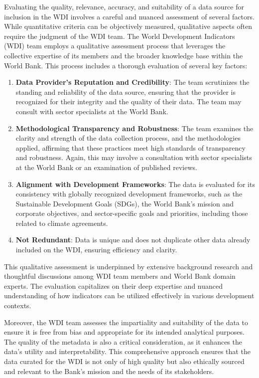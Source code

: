 \documentclass[
  11pt,
  a4paper,
  DIV=11,
  numbers=noendperiod]{scrreprt}
\begin{document}
Evaluating the quality, relevance, accuracy, and suitability of a data
source for inclusion in the WDI involves a careful and nuanced
assessment of several factors. While quantitative criteria can be
objectively measured, qualitative aspects often require the judgment of
the WDI team. The World Development Indicators (WDI) team employs a
qualitative assessment process that leverages the collective expertise
of its members and the broader knowledge base within the World Bank.
This process includes a thorough evaluation of several key factors:

\begin{enumerate}
\def\labelenumi{\arabic{enumi}.}
\item
  \textbf{Data Provider's Reputation and Credibility}: The team
  scrutinizes the standing and reliability of the data source, ensuring
  that the provider is recognized for their integrity and the quality of
  their data. The team may consult with sector specialists at the World
  Bank.
\item
  \textbf{Methodological Transparency and Robustness}: The team examines
  the clarity and strength of the data collection process, and the
  methodologies applied, affirming that these practices meet high
  standards of transparency and robustness. Again, this may involve a
  consultation with sector specialists at the World Bank or an
  examination of published reviews.
\item
  \textbf{Alignment with Development Frameworks}: The data is evaluated
  for its consistency with globally recognized development frameworks,
  such as the Sustainable Development Goals (SDGs), the World Bank's
  mission and corporate objectives, and sector-specific goals and
  priorities, including those related to climate agreements.
\item
  \textbf{Not Redundant}: Data is unique and does not duplicate other
  data already included on the WDI, ensuring efficiency and clarity.
\end{enumerate}

This qualitative assessment is underpinned by extensive background
research and thoughtful discussions among WDI team members and World
Bank domain experts. The evaluation capitalizes on their deep expertise
and nuanced understanding of how indicators can be utilized effectively
in various development contexts.

Moreover, the WDI team assesses the impartiality and suitability of the
data to ensure it is free from bias and appropriate for its intended
analytical purposes. The quality of the metadata is also a critical
consideration, as it enhances the data's utility and interpretability.
This comprehensive approach ensures that the data curated for the WDI is
not only of high quality but also ethically sourced and relevant to the
Bank's mission and the needs of its stakeholders.
\end{document}
